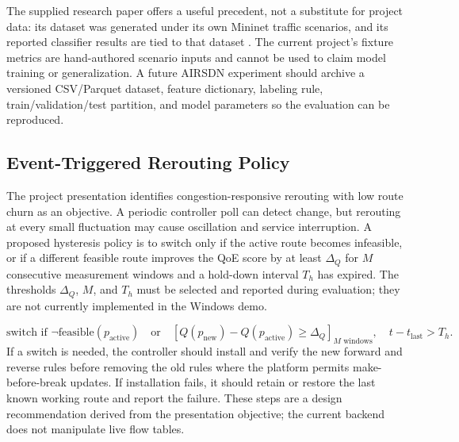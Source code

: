 \documentclass[conference]{IEEEtran}
\begin{document}
The supplied research paper offers a useful precedent, not a substitute for project data: its dataset was generated under its own Mininet traffic scenarios, and its reported classifier results are tied to that dataset \cite{ipek2025airsdn}. The current project's fixture metrics are hand-authored scenario inputs and cannot be used to claim model training or generalization. A future AIRSDN experiment should archive a versioned CSV/Parquet dataset, feature dictionary, labeling rule, train/validation/test partition, and model parameters so the evaluation can be reproduced.

\subsection{Event-Triggered Rerouting Policy}
The project presentation identifies congestion-responsive rerouting with low route churn as an objective. A periodic controller poll can detect change, but rerouting at every small fluctuation may cause oscillation and service interruption. A proposed hysteresis policy is to switch only if the active route becomes infeasible, or if a different feasible route improves the QoE score by at least $\Delta_Q$ for $M$ consecutive measurement windows and a hold-down interval $T_h$ has expired. The thresholds $\Delta_Q$, $M$, and $T_h$ must be selected and reported during evaluation; they are not currently implemented in the Windows demo.

\begin{equation}
\text{switch if }\neg\mathrm{feasible}(p_{\mathrm{active}})\quad\text{or}\quad
\left[Q(p_{\mathrm{new}})-Q(p_{\mathrm{active}})\geq\Delta_Q\right]_{M\text{ windows}},
\quad t-t_{\mathrm{last}}>T_h.
\end{equation}
If a switch is needed, the controller should install and verify the new forward and reverse rules before removing the old rules where the platform permits make-before-break updates. If installation fails, it should retain or restore the last known working route and report the failure. These steps are a design recommendation derived from the presentation objective; the current backend does not manipulate live flow tables.
\end{document}

